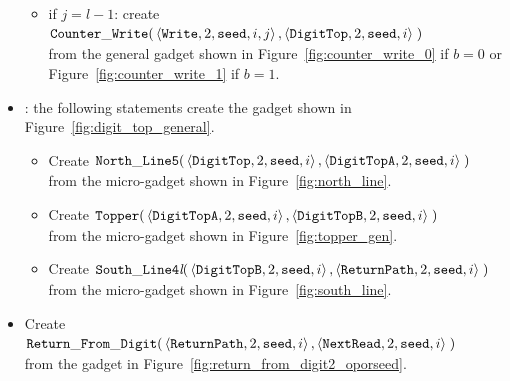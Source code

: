 \begin{itemize}
\begin{itemize}
        \item if $j = l-1$: create
        $\begin{aligned}[t]
            {\tt Counter\_Write}(&\left\langle {\tt Write}, 2, {\tt seed}, i, j \right\rangle, \left\langle {\tt DigitTop}, 2, {\tt seed}, i \right\rangle \;)
        \end{aligned}$\\from the general gadget shown in Figure~\ref{fig:counter_write_0} if $b = 0$ or Figure~\ref{fig:counter_write_1} if $b = 1$.
    \end{itemize}


    \item {\dtop}: the following statements create the gadget shown in Figure~\ref{fig:digit_top_general}.
    \begin{itemize}
        \item Create
        $\begin{aligned}[t]
            {\tt North\_Line5}(& \left \langle {\tt DigitTop},  2, {\tt seed} , i \right\rangle,
                                 \left \langle {\tt DigitTopA}, 2, {\tt seed} , i \right\rangle \;)
        \end{aligned}$\\ from the micro-gadget shown in Figure~\ref{fig:north_line}.

        \item Create
        $\begin{aligned}[t]
            {\tt Topper}(& \left \langle {\tt DigitTopA}, 2, {\tt seed}, i \right\rangle,
                           \left \langle {\tt DigitTopB}, 2, {\tt seed}, i \right\rangle \;)
        \end{aligned}$\\ from the micro-gadget shown in Figure~\ref{fig:topper_gen}.

        \item Create
        $\begin{aligned}[t]
            {\tt South\_Line4\textit{l}}(&\left\langle {\tt DigitTopB}, 2, {\tt seed}, i \right\rangle,
                                          \left\langle {\tt ReturnPath},     2, {\tt seed}, i \right\rangle \;)
        \end{aligned}$\\ from the micro-gadget shown in Figure~\ref{fig:south_line}.
    \end{itemize}


    \item Create
    $\begin{aligned}[t]
        {\tt Return\_From\_Digit}(&\left\langle {\tt ReturnPath},    2, {\tt seed}, i \right\rangle,
                          \left\langle {\tt NextRead}, 2, {\tt seed}, i \right\rangle \;)
    \end{aligned}$\\ from the gadget in Figure~\ref{fig:return_from_digit2_oporseed}.



\end{itemize}
